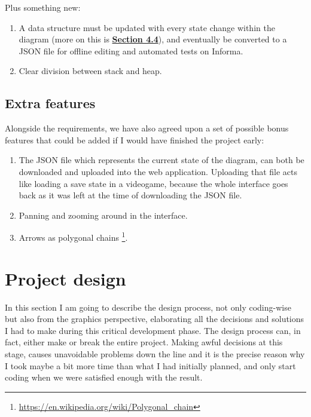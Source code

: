 \documentclass[]{usiinfbachelorproject}
\begin{document}
\noindent Plus something new:

\begin{enumerate}
	\item A data structure must be updated with every state change within the diagram (more on this is \hyperref[storing states]{\textbf{Section 4.4}}), and eventually be converted to a JSON file for offline editing and automated tests on Informa.
	\item Clear division between stack and heap.
\end{enumerate}

\subsection{Extra features}

Alongside the requirements, we have also agreed upon a set of possible bonus features that could be added if I would have finished the project early:

\begin{enumerate}
	\item The JSON file which represents the current state of the diagram, can both be downloaded and uploaded into the web application. Uploading that file acts like loading a save state in a videogame, because the whole interface goes back as it was left at the time of downloading the JSON file.
	\item Panning and zooming around in the interface.
	\item Arrows as polygonal chains \footnote{\url{https://en.wikipedia.org/wiki/Polygonal_chain}}.
\end{enumerate}

\vspace{\fill}
\pagebreak

\section{Project design} \label{design}

In this section I am going to describe the design process, not only coding-wise but also from the graphics perspective, elaborating all the decisions and solutions I had to make during this critical development phase. The design process can, in fact, either make or break the entire project. Making awful decisions at this stage, causes unavoidable problems down the line and it is the precise reason why I took maybe a bit more time than what I had initially planned, and only start coding when we were satisfied enough with the result.
\end{document}

